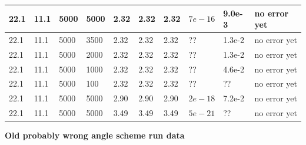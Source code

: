 \documentclass[10pt]{article} %
\begin{document}
\begin{center}
\begin{tabular}{| l | l | l | l | l | l | l | p{3cm} | p{2cm} | p{5cm} |}
    22.1 & 11.1 & 5000 & 5000 & 2.32 & 2.32 & 2.32 & $7e-16$ & 9.0e-3 & no error yet\\\hline
    22.1 & 11.1 & 5000 & 3500 & 2.32 & 2.32 & 2.32 & ?? & 1.3e-2 & no error yet\\\hline
    22.1 & 11.1 & 5000 & 2000 & 2.32 & 2.32 & 2.32 & ?? & 1.3e-2 & no error yet\\\hline
    22.1 & 11.1 & 5000 & 1000 & 2.32 & 2.32 & 2.32 & ?? & 4.6e-2 & no error yet\\\hline
    22.1 & 11.1 & 5000 &  100 & 2.32 & 2.32 & 2.32 & ?? & ?? & no error yet\\\hline
    22.1 & 11.1 & 5000 & 5000 & 2.90 & 2.90 & 2.90 & $2e-18$ & 7.2e-2 & no error yet\\\hline
    22.1 & 11.1 & 5000 & 5000 & 3.49 & 3.49 & 3.49 & $5e-21$ & ?? & no error yet\\\hline
  \end{tabular}
  \textbf{Old probably wrong angle scheme run data}
\end{center}
\end{document}
